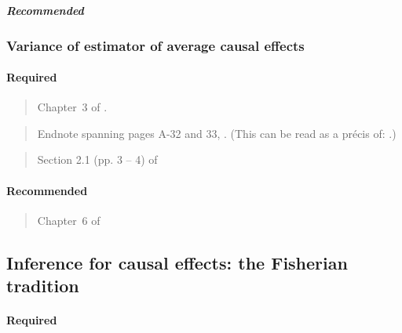 \documentclass[12pt]{article}
\begin{document}
\subparagraph{Recommended}

\begin{verse}  \end{verse}
\begin{verse}  \end{verse}

\subsubsection{Variance of estimator of average causal effects} 

\paragraph*{Required}

\begin{verse}
  Chapter~3 of .
\end{verse}

\begin{verse} Endnote spanning pages A-32 and 33,
  .  (This can be read as a pr{\'e}cis
  of: .)
\end{verse}

\begin{verse} Section 2.1 (pp. 3 -- 4) of  \end{verse}

\paragraph*{Recommended}

\begin{verse} Chapter~6 of  \end{verse}

\begin{verse}  \end{verse}

\begin{verse}  \end{verse}

\subsection{Inference for causal effects: the Fisherian tradition}

\paragraph*{Required}
\end{document}

